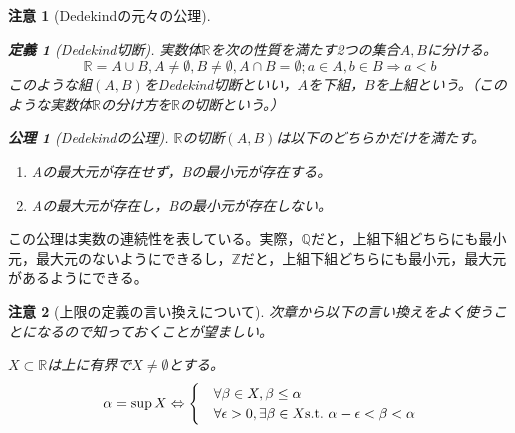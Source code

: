 \documentclass[dvipdfmx,a4j,10pt]{jsarticle}
\theoremstyle{mystyle1}
\theoremstyle{mystyle2}
\newtheorem{dfn*}{定義}
\newtheorem{rem}{注意}
\newtheorem{axi*}{公理}
\begin{document}
\begin{rem}[Dedekindの元々の公理]\
    \vspace{-\baselineskip}
    \begin{framed}
    	\begin{dfn*}[Dedekind切断]
        	実数体$\mathbb{R}$を次の性質を満たす2つの集合$A,B$に分ける。
        	\[\mathbb{R}=A\cup B,A\neq\emptyset,B\neq\emptyset,A\cap B=\emptyset;a\in A,b\in B\Rightarrow a<b\]
        	このような組$(A,B)$をDedekind切断といい，$A$を下組，$B$を上組という。（このような実数体$\mathbb{R}$の分け方を$\mathbb{R}$の切断という。）
        \end{dfn*}
    \end{framed}

    \begin{framed}
        \begin{axi*}[Dedekindの公理]\footnotemark
            $\mathbb{R}$の切断$(A,B)$は以下のどちらかだけを満たす。
            \begin{enumerate}
            \item Aの最大元が存在せず，Bの最小元が存在する。
            \item Aの最大元が存在し，Bの最小元が存在しない。
            \end{enumerate}
        \end{axi*}
    \end{framed}
\end{rem}
この公理は実数の連続性を表している。実際，$\mathbb{Q}$だと，上組下組どちらにも最小元，最大元のないようにできるし，$\mathbb{Z}$だと，上組下組どちらにも最小元，最大元があるようにできる。

\newpage

\begin{rem}[上限の定義の言い換えについて]
    次章から以下の言い換えをよく使うことになるので知っておくことが望ましい。
    \\
    \par
    $X\subset \mathbb{R}$は上に有界で$X\neq\emptyset$とする。
    \[
    \alpha=\sup X
    \Leftrightarrow
    \begin{cases}
    			&\forall\beta\in X,\beta\leq\alpha\\
    			&\forall\epsilon>0,\exists\beta\in X{\rm s.t.}\ \alpha-\epsilon<\beta<\alpha
    		\end{cases}
    		\]
\end{rem}

\newpage
\end{document}
